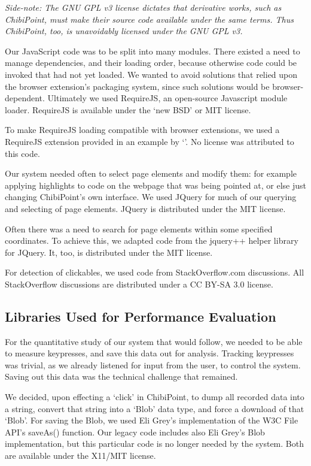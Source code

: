 \documentclass[a4paper, 12pt]{report}
\begin{document}
\textit{Side-note: The GNU GPL v3 license dictates that derivative works, such as ChibiPoint, must make their source code available under the same terms. Thus ChibiPoint, too, is unavoidably licensed under the GNU GPL v3.}

Our JavaScript code was to be split into many modules. There existed a need to manage dependencies, and their loading order, because otherwise code could be invoked that had not yet loaded. We wanted to avoid solutions that relied upon the browser extension's packaging system, since such solutions would be browser-dependent. Ultimately we used RequireJS\cite{requirejs}, an open-source Javascript module loader. RequireJS is available under the `new BSD' or MIT license\cite{requirejslicense,mitlicense}.

To make RequireJS loading compatible with browser extensions, we used a RequireJS extension provided in an example by `\citeauthor{requirejscs}'\cite{requirejslicense}. No license was attributed to this code.

Our system needed often to select page elements and modify them: for example applying highlights to code on the webpage that was being pointed at, or else just changing ChibiPoint's own interface. We used JQuery\cite{jquery} for much of our querying and selecting of page elements. JQuery is distributed under the MIT license\cite{mitlicense}.

Often there was a need to search for page elements within some specified coordinates. To achieve this, we adapted code from the jquery++\cite{jquerypp} helper library for JQuery. It, too, is distributed under the MIT license\cite{mitlicense}.

For detection of clickables, we used code from StackOverflow.com discussions\cite{eventlistenerprototype}. All StackOverflow discussions are distributed under a CC BY-SA 3.0 license\cite{soverflowlicense}.

\subsection{Libraries Used for Performance Evaluation}
For the quantitative study of our system that would follow, we needed to be able to measure keypresses, and save this data out for analysis. Tracking keypresses was trivial, as we already listened for input from the user, to control the system. Saving out this data was the technical challenge that remained.

We decided, upon effecting a `click' in ChibiPoint, to dump all recorded data into a string, convert that string into a `Blob' data type, and force a download of that `Blob'. For saving the Blob, we used Eli Grey's implementation of the W3C File API's saveAs() function\cite{filesaver}. Our legacy code includes also Eli Grey's Blob implementation\cite{blob}, but this particular code is no longer needed by the system. Both are available under the X11/MIT license\cite{x11license}.
\end{document}
